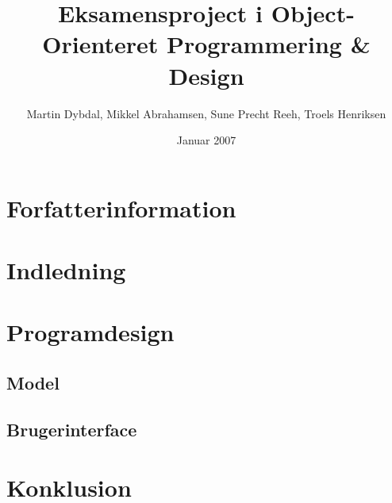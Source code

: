 \documentclass{article}
\title{Eksamensproject i Object-Orienteret Programmering \& Design}
\author{Martin Dybdal, Mikkel Abrahamsen, Sune Precht Reeh, Troels Henriksen}
\date{Januar 2007}
\begin{document}
\maketitle

\section{Forfatterinformation}

\section{Indledning}

\section{Programdesign}

\subsection{Model}

\subsection{Brugerinterface}

\section{Konklusion}
\end{document}
